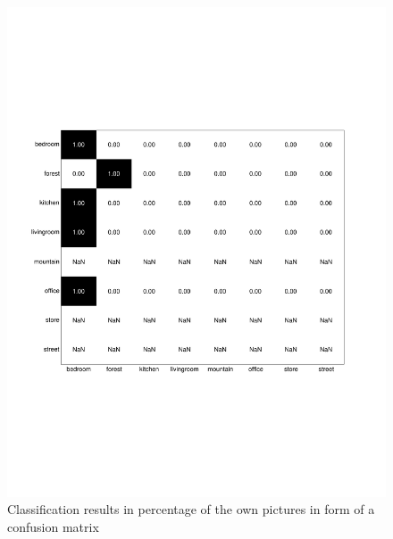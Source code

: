 \documentclass[subfigure,epsfig,fleqn,float,numbers=noenddot]{scrartcl}
\begin{document}
\begin{figure}
		\centering
		\includegraphics[width=\textwidth]{img/conf_matrix_own.pdf}
		\caption{Classification results in percentage of the own pictures in form of a confusion matrix}
		\label{fig:conf_matrix_own}
\end{figure}
\end{document}
